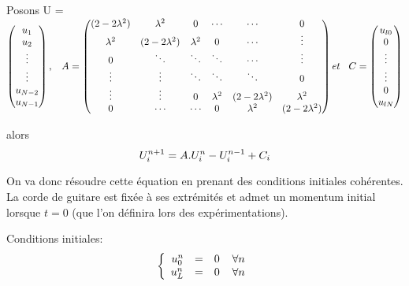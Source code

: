Posons U = 
\begin{math}
\begin{pmatrix}
u_{1}\\
u_{2}\\
\vdots \\
\vdots \\
u_{N-2}\\
u_{N-1}
\end{pmatrix}
, \hspace{3 mm} A = 
\begin{pmatrix}
(2-2\lambda ^2) & \lambda ^2 & 0 & \cdots & \cdots & 0\\
\lambda ^2 & (2-2\lambda ^2) & \lambda ^2 & 0 & \cdots & \vdots\\
0 & \ddots & \ddots & \ddots & \cdots & \vdots\\
\vdots & \vdots & \ddots & \ddots & \ddots & 0\\
\vdots & \vdots & 0 &\lambda ^2 & (2-2\lambda ^2) & \lambda ^2 \\
0 & \cdots & \cdots & 0 & \lambda ^2 & (2-2\lambda ^2)
\end{pmatrix}
et \hspace{3 mm} C = 
\begin{pmatrix}
u_{l0}\\
0\\
\vdots \\
\vdots \\
0\\
u_{lN}
\end{pmatrix}
\end{math}

\vspace*{7 mm}
alors\\

\begin{equation*}
U^{n+1}_i = A.U^{n}_i - U^{n-1}_i + C_i\\
\end{equation*}

On va donc résoudre cette équation en prenant des conditions initiales cohérentes. La corde de guitare est fixée à ses extrémités et admet un momentum initial lorsque $t=0$ (que l'on définira lors des expérimentations).

Conditions initiales: 
\begin{equation*}
\left \{
\begin{array}{rcl}
u^{n}_{0}& = & 0 \hspace*{4 mm} \forall n\\
u^{n}_{L}& = &0 \hspace*{4 mm} \forall n\\
\end{array}
\right.
\end{equation*}

